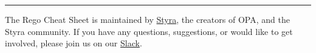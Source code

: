 \begin{center}\rule{0.5\linewidth}{0.5pt}\end{center}

The Rego Cheat Sheet is maintained by \href{http://styra.com}{Styra},
the creators of OPA, and the Styra community.
If you have any questions, suggestions, or would like to
get involved, please join us on our
\href{https://communityinviter.com/apps/styracommunity/signup}{Slack}.
